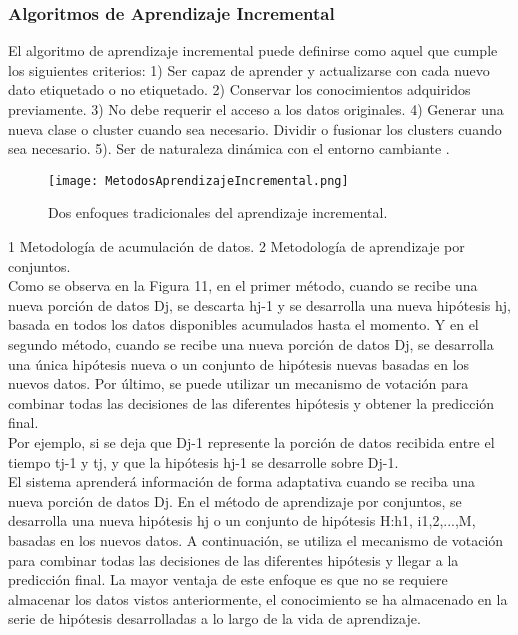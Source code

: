         \subsubsection{Algoritmos de Aprendizaje Incremental}
        	
        	
        El algoritmo de aprendizaje incremental puede definirse como aquel que cumple los siguientes criterios:  
        1) Ser capaz de aprender y actualizarse con cada nuevo dato etiquetado o no etiquetado. 
        2) Conservar los conocimientos adquiridos previamente.
        3) No debe requerir el acceso a los datos originales. 
        4) Generar una nueva clase o cluster cuando sea necesario. Dividir o fusionar los clusters cuando sea necesario. 
        5). Ser de naturaleza dinámica con el entorno cambiante \cite{Deshmukh2013}.
        
        \begin{figure}[H]
        	\centering
        	\texttt{[image: MetodosAprendizajeIncremental.png]}
            \caption{Dos enfoques tradicionales del aprendizaje incremental.}
            \label{fig:fig11}
        \end{figure} 
        1 Metodología de acumulación de datos. 2 Metodología de aprendizaje por conjuntos.\\
        
		Como se observa en la Figura 11, en el primer método, cuando se recibe una nueva porción de datos Dj, se descarta hj-1 y se desarrolla una nueva hipótesis hj, basada en todos los datos disponibles acumulados hasta el momento. 
		Y en el segundo método, cuando se recibe una nueva porción de datos Dj, se desarrolla una única hipótesis nueva o un conjunto de hipótesis nuevas basadas en los nuevos datos. 
		Por último, se puede utilizar un mecanismo de votación para combinar todas las decisiones de las diferentes hipótesis y obtener la predicción final.\\
		
		Por ejemplo, si se deja que Dj-1 represente la porción de datos recibida entre el tiempo tj-1 y tj, y que la hipótesis hj-1 se desarrolle sobre Dj-1.\\
		El sistema aprenderá información de forma adaptativa cuando se reciba una nueva porción de datos Dj.	
		En el método de aprendizaje por conjuntos, se desarrolla una nueva hipótesis hj o un conjunto de hipótesis H:h1, i1,2,...,M, basadas en los nuevos datos.  
		A continuación, se utiliza el mecanismo de votación para combinar todas las decisiones de las diferentes hipótesis y llegar a la predicción final.
		La mayor ventaja de este enfoque es que no se requiere almacenar los datos vistos anteriormente, el conocimiento se ha almacenado en la serie de hipótesis desarrolladas a lo largo de la vida de aprendizaje.\\
		
